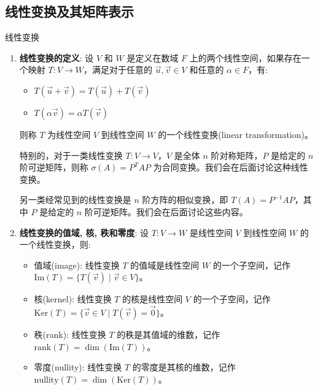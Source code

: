 \documentclass[a4paper,12pt]{ctexart}
\begin{document}
\subsection{线性变换及其矩阵表示}

\begin{mydef}{线性变换}{}
\begin{enumerate}
    \item \textbf{线性变换的定义}: 设 $V$ 和 $W$ 是定义在数域 $F$ 上的两个线性空间，如果存在一个映射 $T: V \to W$，满足对于任意的 $\vec{u}, \vec{v} \in V$ 和任意的 $\alpha \in F$，有:
    \begin{itemize}
        \item $T(\vec{u} + \vec{v}) = T(\vec{u}) + T(\vec{v})$
        \item $T(\alpha \vec{v}) = \alpha T(\vec{v})$
    \end{itemize}
    则称 $T$ 为线性空间 $V$ 到线性空间 $W$ 的一个线性变换(linear transformation)。
    
    特别的，对于一类线性变换 $T: V \to V$，$V$ 是全体 $n$ 阶对称矩阵，$P$ 是给定的 $n$ 阶可逆矩阵，则称 $\sigma(A) = P^TAP$ 为合同变换。我们会在后面讨论这种线性变换。
    
    另一类经常见到的线性变换是 $n$ 阶方阵的相似变换，即 $T(A) = P^{-1}AP$，其中 $P$ 是给定的 $n$ 阶可逆矩阵。我们会在后面讨论这些内容。
    
    \item \textbf{线性变换的值域, 核, 秩和零度}: 设 $T: V \to W$ 是线性空间 $V$ 到线性空间 $W$ 的一个线性变换，则:
    \begin{itemize}
        \item 值域(image): 线性变换 $T$ 的值域是线性空间 $W$ 的一个子空间，记作 $\text{Im}(T) = \{ T(\vec{v}) \mid \vec{v} \in V \}$。
        \item 核(kernel): 线性变换 $T$ 的核是线性空间 $V$ 的一个子空间，记作 $\text{Ker}(T) = \{ \vec{v} \in V \mid T(\vec{v}) = \vec{0} \}$。
        \item 秩(rank): 线性变换 $T$ 的秩是其值域的维数，记作 $\text{rank}(T) = \dim(\text{Im}(T))$。
        \item 零度(nullity): 线性变换 $T$ 的零度是其核的维数，记作 $\text{nullity}(T) = \dim(\text{Ker}(T))$。
    \end{itemize}
\end{enumerate}
\end{mydef}

\newpage
\end{document}
